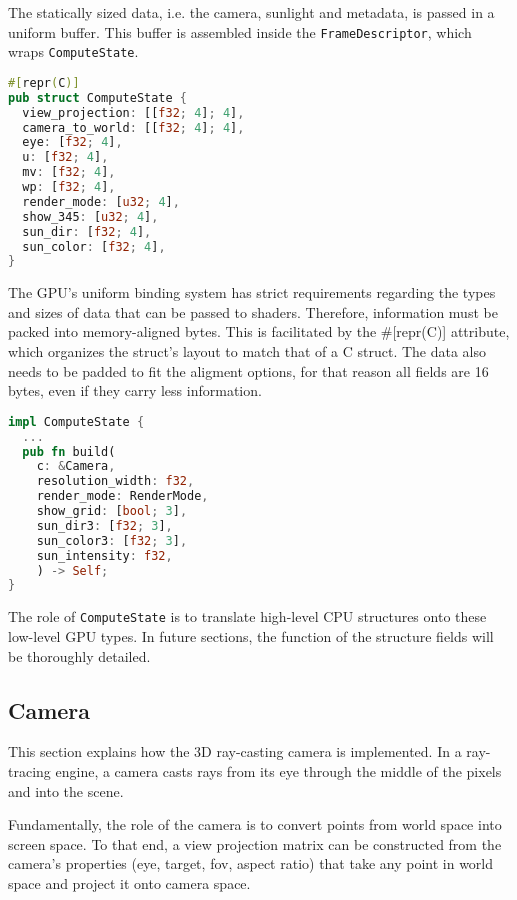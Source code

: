 The statically sized data, i.e. the camera, sunlight and metadata, is passed in a uniform buffer. This buffer is assembled inside the \verb|FrameDescriptor|, which wraps \verb|ComputeState|.

\begin{lstlisting}[language=rust]
#[repr(C)]
pub struct ComputeState {
  view_projection: [[f32; 4]; 4],
  camera_to_world: [[f32; 4]; 4],
  eye: [f32; 4],
  u: [f32; 4],
  mv: [f32; 4],
  wp: [f32; 4],
  render_mode: [u32; 4],
  show_345: [u32; 4],
  sun_dir: [f32; 4],
  sun_color: [f32; 4],
}
\end{lstlisting}

The GPU's uniform binding system has strict requirements regarding the types and sizes of data that can be passed to shaders. Therefore, information must be packed into memory-aligned bytes. This is facilitated by the \#[repr(C)] attribute, which organizes the struct's layout to match that of a C struct. The data also needs to be padded to fit the aligment options, for that reason all fields are 16 bytes, even if they carry less information.

\begin{lstlisting}[language=rust,caption={\texttt{ComputeState} build method that transforms CPU data into GPU-ready data},captionpos=b,
  label={cstate:build}]
impl ComputeState {
  ...
  pub fn build(
    c: &Camera,
    resolution_width: f32,
    render_mode: RenderMode,
    show_grid: [bool; 3],
    sun_dir3: [f32; 3],
    sun_color3: [f32; 3],
    sun_intensity: f32,
    ) -> Self;
}
\end{lstlisting}

The role of \verb|ComputeState| is to translate high-level CPU structures onto these low-level GPU types. In future sections, the function of the structure fields will be thoroughly detailed.

\subsection{Camera}

This section explains how the 3D ray-casting camera is implemented. In a ray-tracing engine, a camera casts rays from its eye through the middle of the pixels and into the scene.

Fundamentally, the role of the camera is to convert points from world space into screen space. To that end, a view projection matrix can be constructed from the camera's properties (eye, target, \acrshort{fov}, aspect ratio) that take any point in world space and project it onto camera space.

